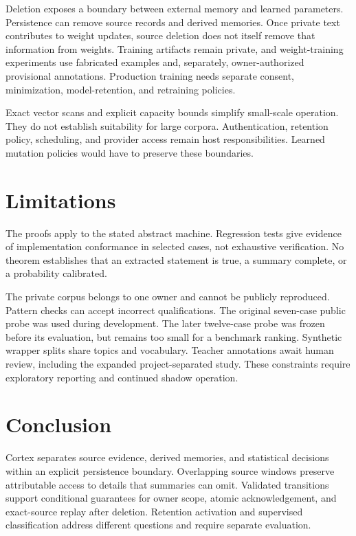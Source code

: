 \documentclass[11pt]{article}
\begin{document}
Deletion exposes a boundary between external memory and learned parameters. Persistence can remove source records and derived memories. Once private text contributes to weight updates, source deletion does not itself remove that information from weights. Training artifacts remain private, and weight-training experiments use fabricated examples and, separately, owner-authorized provisional annotations. Production training needs separate consent, minimization, model-retention, and retraining policies.

Exact vector scans and explicit capacity bounds simplify small-scale operation. They do not establish suitability for large corpora. Authentication, retention policy, scheduling, and provider access remain host responsibilities. Learned mutation policies would have to preserve these boundaries.

\section{Limitations}
The proofs apply to the stated abstract machine. Regression tests give evidence of implementation conformance in selected cases, not exhaustive verification. No theorem establishes that an extracted statement is true, a summary complete, or a probability calibrated.

The private corpus belongs to one owner and cannot be publicly reproduced. Pattern checks can accept incorrect qualifications. The original seven-case public probe was used during development. The later twelve-case probe was frozen before its evaluation, but remains too small for a benchmark ranking. Synthetic wrapper splits share topics and vocabulary. Teacher annotations await human review, including the expanded project-separated study. These constraints require exploratory reporting and continued shadow operation.

\section{Conclusion}
Cortex separates source evidence, derived memories, and statistical decisions within an explicit persistence boundary. Overlapping source windows preserve attributable access to details that summaries can omit. Validated transitions support conditional guarantees for owner scope, atomic acknowledgement, and exact-source replay after deletion. Retention activation and supervised classification address different questions and require separate evaluation.
\end{document}
